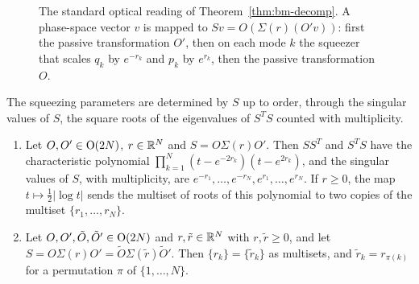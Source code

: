 \begin{vetdenv}
\begin{figure}[ht]
\centering\vetdcolor
{}
\caption{The standard optical reading of Theorem~\ref{thm:bm-decomp}. A phase-space vector $v$ is mapped to
$Sv=O(\Sigma(r)(O'v))$: first the passive transformation $O'$, then on each mode $k$ the squeezer that scales $q_k$ by
$e^{-r_k}$ and $p_k$ by $e^{r_k}$, then the passive transformation $O$.}\label{fig:bm-optics}
\end{figure}

The squeezing parameters are determined by $S$ up to order, through the singular values of $S$, the square roots of
the eigenvalues of $S^TS$ counted with multiplicity.

\begin{proposition}\label{prop:bm-singular}
\begin{enumerate}
\item[(a)] Let $O,O'\in\mathrm{O}(2N)$, $r\in\mathbb R^N$ and $S=O\Sigma(r)O'$. Then $SS^T$ and $S^TS$ have the characteristic polynomial
$\prod_{k=1}^N(t-e^{-2r_k})(t-e^{2r_k})$, and the singular values of $S$, with multiplicity, are
$e^{-r_1},\ldots,e^{-r_N},e^{r_1},\ldots,e^{r_N}$. If $r\ge0$, the map $t\mapsto\frac12\lvert\log t\rvert$ sends the
multiset of roots of this polynomial to two copies of the multiset $\{r_1,\ldots,r_N\}$.
\item[(b)] Let $O,O',\tilde O,\tilde O'\in\mathrm{O}(2N)$ and $r,\tilde r\in\mathbb R^N$ with $r,\tilde r\ge0$, and let $S=O\Sigma(r)O'=\tilde
O\Sigma(\tilde r)\tilde O'$. Then $\{r_k\}=\{\tilde r_k\}$ as multisets, and $\tilde r_k=r_{\pi(k)}$ for a permutation $\pi$
of $\{1,\ldots,N\}$.
\end{enumerate}
\end{proposition}


\end{vetdenv}
